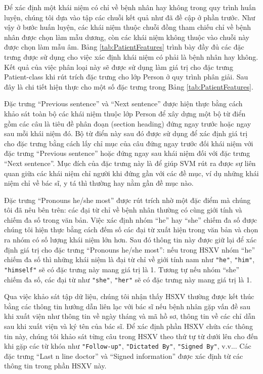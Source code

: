 Để xác định một khái niệm có chỉ về bệnh nhân hay không trong quy trình huấn luyện, chúng tôi dựa vào tập các chuỗi kết quả như đã đề cập ở phần trước. Như vậy ở bước huấn luyện, các khái niệm thuộc chuỗi đồng tham chiếu chỉ về bệnh nhân được chọn làm mẫu dương, còn các khái niệm không thuộc vào chuỗi này được chọn làm mẫu âm. Bảng \ref{tab:PatientFeatures} trình bày đầy đủ các đặc trưng được sử dụng cho việc xác định khái niệm có phải là bệnh nhân hay không. Kết quả của việc phân loại này sẽ được sử dụng làm giá trị cho đặc trưng Patient-class khi rút trích đặc trưng cho lớp Person ở quy trình phân giải. Sau đây là chi tiết hiện thực cho một số đặc trưng trong Bảng \ref{tab:PatientFeatures}.

Đặc trưng ``Previous sentence'' và ``Next sentence'' được hiện thực bằng cách khảo sát toàn bộ các khái niệm thuộc lớp Person để xây dựng một bộ từ điển gồm các câu là tiêu đề phân đoạn (section heading) đứng ngay trước hoặc ngay sau mỗi khái niệm đó. Bộ từ điển này sau đó được sử dụng để xác định giá trị cho đặc trưng bằng cách lấy chỉ mục của câu đứng ngay trước đối khái niệm với đặc trưng ``Previous sentence'' hoặc đứng ngay sau khái niệm đối với đặc trưng ``Next sentence''. Mục đích của đặc trưng này là để giúp SVM rút ra được sự liên quan giữa các khái niệm chỉ người khi đứng gần với các đề mục, ví dụ những khái niệm chỉ về bác sĩ, y tá thì thường hay nằm gần đề mục nào.

Đặc trưng ``Pronouns he/she most'' được rút trích nhờ một đặc điểm mà chúng tôi đã nêu bên trên: các đại từ chỉ về bệnh nhân thường có cùng giới tính và chiếm đa số trong văn bản. Việc xác định nhóm ``he'' hay ``she'' chiếm đa số được chúng tôi hiện thực bằng cách đếm số các đại từ xuất hiện trong văn bản và chọn ra nhóm có số lượng khái niệm lớn hơn. Sau đó thông tin này được giữ lại để xác định giá trị cho đặc trưng ``Pronouns he/she most'': nếu trong HSXV nhóm ``he'' chiếm đa số thì những khái niệm là đại từ chỉ về giới tính nam như \texttt{"he"}, \texttt{"him"}, \texttt{"himself"} sẽ có đặc trưng này mang giá trị là 1. Tương tự nếu nhóm ``she'' chiếm đa số, các đại từ như \texttt{"she"}, \texttt{"her"} sẽ có đặc trưng này mang giá trị là 1.

Qua việc khảo sát tập dữ liệu, chúng tôi nhận thấy HSXV thường được kết thúc bằng các thông tin hướng dẫn liên lạc với bác sĩ nếu bệnh nhân gặp vấn đề sau khi xuất viện như thông tin về ngày tháng và mã hồ sơ, thông tin về các chỉ dẫn sau khi xuất viện và ký tên của bác sĩ. Để xác định phần HSXV chứa các thông tin này, chúng tôi khảo sát từng câu trong HSXV theo thứ tự từ dưới lên cho đến khi gặp các từ khóa như \texttt{"Follow-up"}, \texttt{"Dictated By"}, \texttt{"Signed By"}, v.v... Các đặc trưng ``Last n line doctor'' và ``Signed information'' được xác định từ các thông tin trong phần HSXV này.

